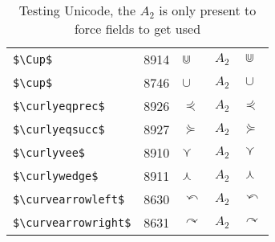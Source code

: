 \documentclass{article}
\begin{document}
\begin{table}
\begin{center}
\begin{tabular}{llll}
 \verb#$\Cup$#                & 8914 & $\Cup$                & $A_2\quad \Cup$\\
 \verb#$\cup$#                & 8746 & $\cup$                & $A_2\quad \cup$\\
 \verb#$\curlyeqprec$#        & 8926 & $\curlyeqprec$        & $A_2\quad \curlyeqprec$\\
 \verb#$\curlyeqsucc$#        & 8927 & $\curlyeqsucc$        & $A_2\quad \curlyeqsucc$\\
 \verb#$\curlyvee$#           & 8910 & $\curlyvee$           & $A_2\quad \curlyvee$\\
 \verb#$\curlywedge$#         & 8911 & $\curlywedge$         & $A_2\quad \curlywedge$\\
 \verb#$\curvearrowleft$#     & 8630 & $\curvearrowleft$     & $A_2\quad \curvearrowleft$\\
 \verb#$\curvearrowright$#    & 8631 & $\curvearrowright$    & $A_2\quad \curvearrowright$\\
\end{tabular}
\end{center}
\caption{Testing Unicode, the $A_2$ is only present to force fields to get used}
\end{table}
\end{document}
